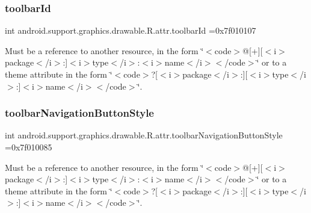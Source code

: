 \subsubsection{\texorpdfstring{toolbar\+Id}{toolbarId}}
{\footnotesize\ttfamily int android.\+support.\+graphics.\+drawable.\+R.\+attr.\+toolbar\+Id =0x7f010107\hspace{0.3cm}{\ttfamily [static]}}

Must be a reference to another resource, in the form \char`\"{}$<$code$>$@\mbox{[}+\mbox{]}\mbox{[}$<$i$>$package$<$/i$>$\+:\mbox{]}$<$i$>$type$<$/i$>$\+:$<$i$>$name$<$/i$>$$<$/code$>$\char`\"{} or to a theme attribute in the form \char`\"{}$<$code$>$?\mbox{[}$<$i$>$package$<$/i$>$\+:\mbox{]}\mbox{[}$<$i$>$type$<$/i$>$\+:\mbox{]}$<$i$>$name$<$/i$>$$<$/code$>$\char`\"{}. \mbox{\label{classandroid_1_1support_1_1graphics_1_1drawable_1_1R_1_1attr_a1d07309d29ed1b8802bc51967977a48d}} 
\subsubsection{\texorpdfstring{toolbar\+Navigation\+Button\+Style}{toolbarNavigationButtonStyle}}
{\footnotesize\ttfamily int android.\+support.\+graphics.\+drawable.\+R.\+attr.\+toolbar\+Navigation\+Button\+Style =0x7f010085\hspace{0.3cm}{\ttfamily [static]}}

Must be a reference to another resource, in the form \char`\"{}$<$code$>$@\mbox{[}+\mbox{]}\mbox{[}$<$i$>$package$<$/i$>$\+:\mbox{]}$<$i$>$type$<$/i$>$\+:$<$i$>$name$<$/i$>$$<$/code$>$\char`\"{} or to a theme attribute in the form \char`\"{}$<$code$>$?\mbox{[}$<$i$>$package$<$/i$>$\+:\mbox{]}\mbox{[}$<$i$>$type$<$/i$>$\+:\mbox{]}$<$i$>$name$<$/i$>$$<$/code$>$\char`\"{}. \mbox{\label{classandroid_1_1support_1_1graphics_1_1drawable_1_1R_1_1attr_ad1edc0d47dc9103614d9ecfdabe116b0}} 
